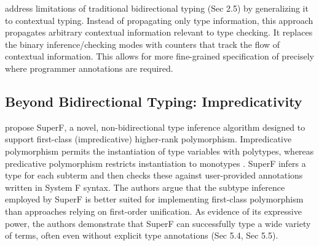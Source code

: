 \cite{xue-contextual-2024} address limitations of traditional bidirectional typing (Sec 2.5) by generalizing it to contextual typing. Instead of propagating only type information, this approach propagates arbitrary contextual information relevant to type checking. It replaces the binary inference/checking modes with counters that track the flow of contextual information. This allows for more fine-grained specification of precisely where programmer annotations are required.

\subsection{Beyond Bidirectional Typing: Impredicativity}

\citeauthor{parreaux-when-2024} \cite{parreaux-when-2024} propose SuperF, a novel, non-bidirectional type inference algorithm designed to support first-class (impredicative) higher-rank polymorphism. Impredicative polymorphism permits the instantiation of type variables with polytypes, whereas predicative polymorphism restricts instantiation to monotypes \cite[Sec 3.4]{jones-practical-2007}. SuperF infers a type for each subterm and then checks these against user-provided annotations written in System F syntax. The authors argue that the subtype inference employed by SuperF is better suited for implementing first-class polymorphism than approaches relying on first-order unification. As evidence of its expressive power, the authors demonstrate that SuperF can successfully type a wide variety of terms, often even without explicit type annotations (Sec 5.4, Sec 5.5).